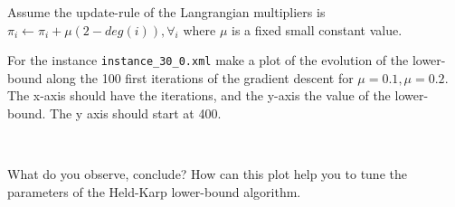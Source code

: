 \documentclass[12pt]{report}
\newcommand{\answerbox}[2]{\hfill\break\\
        \framebox[\linewidth]{\parbox[c][#1][c]{\dimexpr\linewidth-2\fboxsep-2\fboxrule}{#2}}
}
\begin{document}
\pagebreak


\begin{Exercise}[title={Held and Karp lower-bound}]

Assume the update-rule of the Langrangian multipliers is $\pi_i \leftarrow \pi_i + \mu (2-deg(i)) , \forall_i$ 
where $\mu$ is a fixed small constant value.

\Question For the instance \verb|instance_30_0.xml| make a plot of the evolution of the lower-bound along the 100 first iterations of the gradient descent
for $\mu =0.1, \mu = 0.2$. The x-axis should have the iterations, and the y-axis the value of the lower-bound.
The y axis should start at 400.

\answerbox{12cm}{
}


\Question What do you observe, conclude? How can this plot help you to tune the parameters of the Held-Karp lower-bound algorithm.
\answerbox{4cm}{
}


\end{Exercise}
\end{document}
